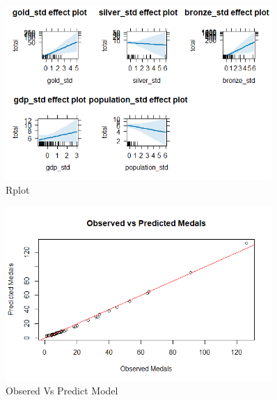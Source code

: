 \documentclass[a4paper,12pt]{article}
\begin{document}
\begin{figure}[H]
    \centering
    \includegraphics[width=0.9\textwidth]{images/Rplot.png}
    \caption{Rplot}
    \label{fig:dataset_fig_5}
\end{figure}


\begin{figure}[H]
    \centering
    \includegraphics[width=0.9\textwidth]{images/Rplot02.png}
    \caption{Obsered Vs Predict Model}
    \label{fig:dataset_fig_7}
\end{figure}
\end{document}
